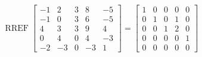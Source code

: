 \begin{exerciseAnswer} 


\[\operatorname{RREF} \left[\begin{array}{ccccc}
-1 & 2 & 3 & 8 & -5 \\
-1 & 0 & 3 & 6 & -5 \\
4 & 3 & 3 & 9 & 4 \\
0 & 4 & 0 & 4 & -3 \\
-2 & -3 & 0 & -3 & 1
\end{array}\right] = \left[\begin{array}{ccccc}
1 & 0 & 0 & 0 & 0 \\
0 & 1 & 0 & 1 & 0 \\
0 & 0 & 1 & 2 & 0 \\
0 & 0 & 0 & 0 & 1 \\
0 & 0 & 0 & 0 & 0
\end{array}\right] \]



\end{exerciseAnswer}
